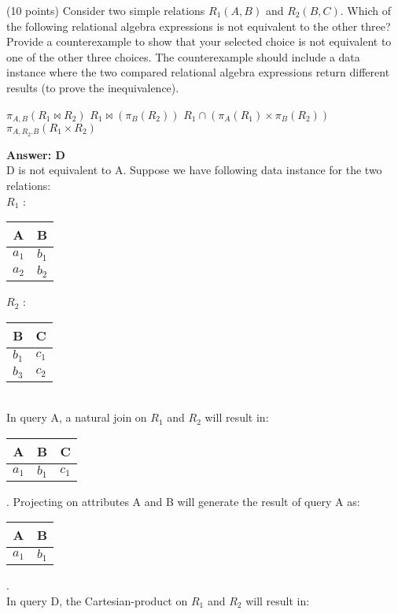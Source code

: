 \begin{questions}
\question (10 points) Consider two simple relations $R_1(A, B)$ and $R_2(B, C)$. Which of the following relational algebra expressions is not equivalent to the other three? Provide a counterexample to show that your selected choice is not equivalent to one of the other three choices. The counterexample should include a data instance where the two compared relational algebra expressions return different results (to prove the inequivalence). 
\begin{choices}
    \choice $\pi_{A, B}(R_1\bowtie R_2)$
    \choice $R_1 \bowtie(\pi_{B}(R_2))$
    \choice $R_1\cap (\pi_{A}(R_1)\times \pi_{B}(R_2))$
    \choice $\pi_{A, R_2.B}(R_1 \times R_2)$
\end{choices}
\textbf{Answer: D} \\
D is not equivalent to A. Suppose we have following data instance for the two relations: \\
$R_1$ :
\begin{tabular}{|c|c|}
    \hline
    A & B \\
    \hline
    $a_1$ & $b_1$ \\
    \hline
    $a_2$ & $b_2$ \\
    \hline
\end{tabular}
$R_2$ :
\begin{tabular}{|c|c|}
    \hline
    B & C \\
    \hline
    $b_1$ & $c_1$ \\
    \hline
    $b_3$ & $c_2$ \\
    \hline
\end{tabular} \\
In query A, a natural join on $R_1$ and $R_2$ will result in: 
\begin{tabular}{|c|c|c|}
    \hline
    A & B & C \\
    \hline
    $a_1$ & $b_1$ & $c_1$ \\
    \hline
\end{tabular}. Projecting on attributes A and B will generate the result of query A as: 
\begin{tabular}{|c|c|}
    \hline
    A & B \\
    \hline
    $a_1$ & $b_1$ \\
    \hline
\end{tabular}. \\
In query D, the Cartesian-product on $R_1$ and $R_2$ will result in:
\begin{tabular}{|c|c|c|c|}
    \hline

\end{tabular}
\end{questions}
